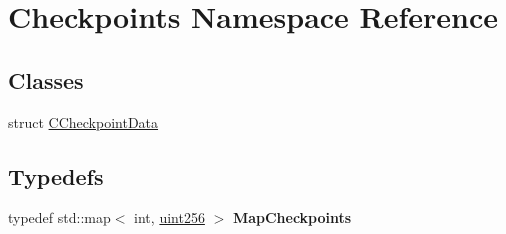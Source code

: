 \hypertarget{namespace_checkpoints}{}\section{Checkpoints Namespace Reference}
\label{namespace_checkpoints}
\subsection*{Classes}
\begin{DoxyCompactItemize}
\item 
struct \mbox{\hyperlink{struct_checkpoints_1_1_c_checkpoint_data}{C\+Checkpoint\+Data}}
\end{DoxyCompactItemize}
\subsection*{Typedefs}
\begin{DoxyCompactItemize}
\item 
\mbox{\label{namespace_checkpoints_a996cca530c4568a2eb4516e8f351b9a2}} 
typedef std\+::map$<$ int, \mbox{\hyperlink{classuint256}{uint256}} $>$ {\bfseries Map\+Checkpoints}
\end{DoxyCompactItemize}
